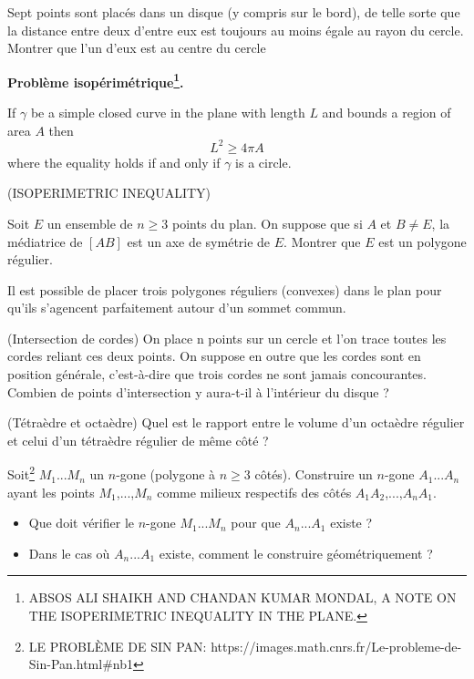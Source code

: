 \begin{example}
Sept points sont placés dans un disque (y compris sur le bord), de telle sorte que la
distance entre deux d’entre eux est toujours au moins égale au rayon du cercle. Montrer que
l’un d’eux est au centre du cercle
\end{example}

\textbf{Problème isopérimétrique\footnote{ABSOS ALI SHAIKH AND CHANDAN KUMAR MONDAL, A NOTE ON THE ISOPERIMETRIC INEQUALITY IN THE PLANE.}.}
\\
\begin{theorem}
If $\gamma$ be a simple closed curve in the plane with length $L$ and bounds a region of area $A$ then
\[
L^{2} \geq 4 \pi A
\]
where the equality holds if and only if $\gamma$ is a circle.
\end{theorem}

\begin{example}{(ISOPERIMETRIC INEQUALITY)}
\end{example}

\begin{exercise}
Soit $E$ un ensemble de $n \geq 3$ points du plan. On suppose que si $A$ et $B \neq E$, la médiatrice
de $\left[AB\right]$ est un axe de symétrie de $E$. Montrer que $E$ est un polygone régulier.
\end{exercise}

\begin{exercise}
Il est possible de placer trois polygones réguliers (convexes) dans le plan pour qu'ils s'agencent parfaitement autour d'un sommet commun.
\end{exercise}

\begin{exercise}{(Intersection de cordes)}
On place n points sur un cercle et l'on trace toutes les cordes reliant ces deux points. On
suppose en outre que les cordes sont en position générale, c'est-à-dire que trois cordes ne
sont jamais concourantes. Combien de points d'intersection y aura-t-il à l'intérieur du disque ?
\end{exercise}

\begin{exercise}{(Tétraèdre et octaèdre)}
Quel est le rapport entre le volume d'un octaèdre régulier et celui d'un tétraèdre régulier de même côté ?
\end{exercise}
\begin{exercise}
Soit\footnote{LE PROBLÈME DE SIN PAN: https://images.math.cnrs.fr/Le-probleme-de-Sin-Pan.html\#nb1} $M_{1}$...$M_{n}$ un $n$-gone (polygone à $n\geq 3$ côtés). Construire un $n$-gone $A_{1}$...$A_{n}$ ayant les points $M_{1}$,...,$M_{n}$ comme milieux respectifs des côtés $A_{1}A_{2}$,...,$A_{n}A_{1}$.
 \begin{itemize}
   \item Que doit vérifier le $n$-gone $M_{1}$...$M_{n}$ pour que $A_{n}$...$A_{1}$ existe ?
   \item Dans le cas où $A_{n}$...$A_{1}$ existe, comment le construire géométriquement ?
 \end{itemize}

\end{exercise}
